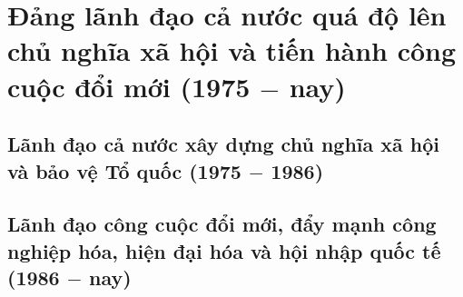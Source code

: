 \chapter{Đảng lãnh đạo cả nước quá độ lên chủ nghĩa xã hội và tiến hành công cuộc đổi mới (1975 $-$ nay)}
\section{Lãnh đạo cả nước xây dựng chủ nghĩa xã hội và bảo vệ Tổ quốc (1975 $-$ 1986)}
\section{Lãnh đạo công cuộc đổi mới, đẩy mạnh công nghiệp hóa, hiện đại hóa và hội nhập quốc tế (1986 $-$ nay)}
